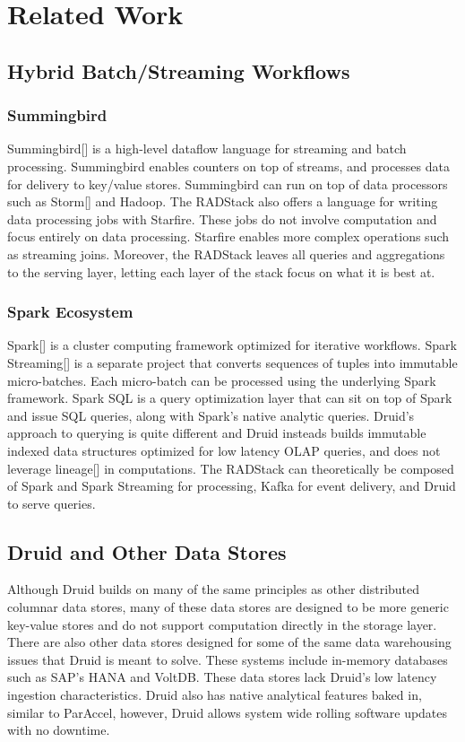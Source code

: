 \documentclass{vldb}
\begin{document}
\section{Related Work}
\label{sec:related}

\subsection{Hybrid Batch/Streaming Workflows}

\subsubsection{Summingbird}
Summingbird[] is a high-level dataflow language for streaming and batch
processing. Summingbird enables counters on top of streams, and processes data
for delivery to key/value stores. Summingbird can run on top of data processors
such as Storm[] and Hadoop. The RADStack also offers a language for writing
data processing jobs with Starfire. These jobs do not involve computation and
focus entirely on data processing. Starfire enables more complex operations
such as streaming joins. Moreover, the RADStack leaves all queries and
aggregations to the serving layer, letting each layer of the stack focus on
what it is best at.

\subsubsection{Spark Ecosystem}
Spark[] is a cluster computing framework optimized for iterative workflows.
Spark Streaming[] is a separate project that converts sequences of tuples into
immutable micro-batches. Each micro-batch can be processed using the underlying
Spark framework. Spark SQL is a query optimization layer that can sit on top of
Spark and issue SQL queries, along with Spark’s native analytic queries.
Druid’s approach to querying is quite different and Druid insteads builds
immutable indexed data structures optimized for low latency OLAP queries, and
does not leverage lineage[] in computations. The RADStack can theoretically be
composed of Spark and Spark Streaming for processing, Kafka for event delivery,
and Druid to serve queries.

\subsection{Druid and Other Data Stores}
Although Druid builds on many of the same principles as other distributed
columnar data stores\cite{fink2012distributed}, many of these data stores are
designed to be more generic key-value stores\cite{lakshman2010cassandra} and do
not support computation directly in the storage layer. There are also other
data stores designed for some of the same data warehousing issues that Druid is
meant to solve. These systems include in-memory databases such as SAP’s
HANA\cite{farber2012sap} and VoltDB\cite{voltdb2010voltdb}. These data stores
lack Druid’s low latency ingestion characteristics. Druid also has native
analytical features baked in, similar to ParAccel\cite{paraccel2013}, however,
Druid allows system wide rolling software updates with no downtime. 
\end{document}
